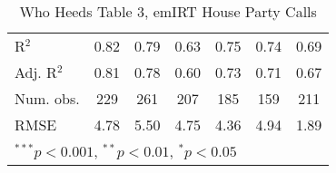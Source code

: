 \documentclass[12pt]{article}
\begin{document}
\begin{table}
\begin{center}
\begin{tabular}{l c c c c c c }
			\hline
			R$^2$                       & 0.82          & 0.79          & 0.63          & 0.75           & 0.74           & 0.69          \\
			Adj. R$^2$                  & 0.81          & 0.78          & 0.60          & 0.73           & 0.71           & 0.67          \\
			Num. obs.                   & 229           & 261           & 207           & 185            & 159            & 211           \\
			RMSE                        & 4.78          & 5.50          & 4.75          & 4.36           & 4.94           & 1.89          \\
			\hline
			\multicolumn{7}{l}{\scriptsize{$^{***}p<0.001$, $^{**}p<0.01$, $^*p<0.05$}}
		\end{tabular}
		\caption{Who Heeds Table 3, emIRT House Party Calls}
	\end{center}
\end{table}
\end{document}
